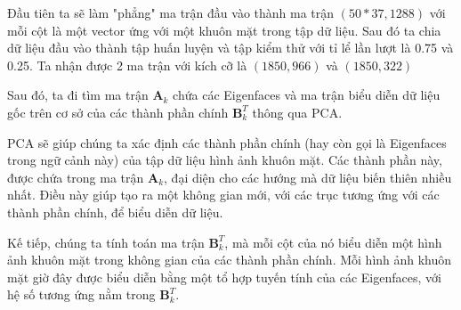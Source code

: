 \documentclass[14pt,oneside,a4paper]{report}
\numberwithin{equation}{section}
\begin{document}
Đầu tiên ta sẽ làm "phẳng" ma trận đầu vào thành ma trận $(50*37,1288)$ với mỗi cột là một vector ứng với một khuôn mặt trong tập dữ liệu. Sau đó ta chia dữ liệu đầu vào thành tập huấn luyện và tập kiểm thử với tỉ lể lần lượt là 0.75 và 0.25. Ta nhận được 2 ma trận với kích cỡ là $(1850,966)$ và $(1850,322)$

Sau đó, ta đi tìm ma trận $\mathbf{A}_k$ chứa các Eigenfaces và ma trận biểu diễn dữ liệu gốc trên cơ sở của các thành phần chính $\mathbf{B}_k^T$ thông qua PCA.

PCA sẽ giúp chúng ta xác định các thành phần chính (hay còn gọi là Eigenfaces trong ngữ cảnh này) của tập dữ liệu hình ảnh khuôn mặt. Các thành phần này, được chứa trong ma trận $\mathbf{A}_k$, đại diện cho các hướng mà dữ liệu biến thiên nhiều nhất. Điều này giúp tạo ra một không gian mới, với các trục tương ứng với các thành phần chính, để biểu diễn dữ liệu.

Kế tiếp, chúng ta tính toán ma trận $\mathbf{B}_k^T$, mà mỗi cột của nó biểu diễn một hình ảnh khuôn mặt trong không gian của các thành phần chính. Mỗi hình ảnh khuôn mặt giờ đây được biểu diễn bằng một tổ hợp tuyến tính của các Eigenfaces, với hệ số tương ứng nằm trong $\mathbf{B}_k^T$.
\end{document}

